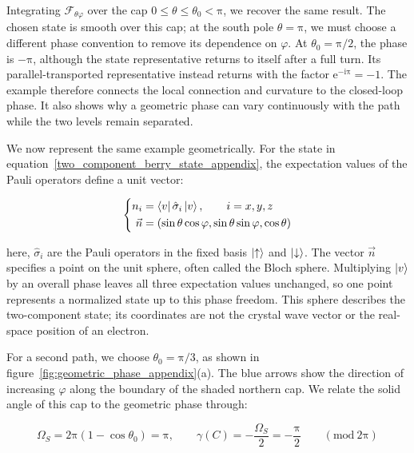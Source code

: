 Integrating $\mathcal{F}_{\theta\varphi}$ over the cap $0\leq\theta\leq\theta_0<\mathrm{\pi}$, we recover the same result.
The chosen state is smooth over this cap; at the south pole $\theta=\mathrm{\pi}$, we must choose a different phase convention to remove its dependence on $\varphi$.
At $\theta_0=\mathrm{\pi}/2$, the phase is $-\mathrm{\pi}$, although the state representative returns to itself after a full turn.
Its parallel-transported representative instead returns with the factor $\mathrm{e}^{-\mathrm{i}\mathrm{\pi}}=-1$.
The example therefore connects the local connection and curvature to the closed-loop phase.
It also shows why a geometric phase can vary continuously with the path while the two levels remain separated.

We now represent the same example geometrically.
For the state in equation~\eqref{two_component_berry_state_appendix}, the expectation values of the Pauli operators define a unit vector:

\begin{equation}
\left\{\begin{aligned}
    n_i&=\bra{v}\hat{\sigma}_i\ket{v},\qquad i=x,y,z \\
    \vec{n}&=(\sin\theta\cos\varphi,\sin\theta\sin\varphi,\cos\theta)
\end{aligned}\right.
\label{two_component_state_sphere_appendix}
\end{equation}

here, $\hat{\sigma}_i$ are the Pauli operators in the fixed basis $\ket{\uparrow}$ and $\ket{\downarrow}$.
The vector $\vec{n}$ specifies a point on the unit sphere, often called the Bloch sphere.
Multiplying $\ket{v}$ by an overall phase leaves all three expectation values unchanged,
so one point represents a normalized state up to this phase freedom.
This sphere describes the two-component state; its coordinates are not the crystal wave vector or the real-space position of an electron.

For a second path, we choose $\theta_0=\mathrm{\pi}/3$, as shown in figure~\ref{fig:geometric_phase_appendix}(a).
The blue arrows show the direction of increasing $\varphi$ along the boundary of the shaded northern cap.
We relate the solid angle of this cap to the geometric phase through:

\begin{equation}
    \Omega_S=2\mathrm{\pi}(1-\cos\theta_0)=\mathrm{\pi},
    \qquad \gamma(C)=-\frac{\Omega_S}{2}=-\frac{\mathrm{\pi}}{2}
    \qquad (\mathrm{mod}\ 2\mathrm{\pi})
\label{two_component_solid_angle_appendix}
\end{equation}


